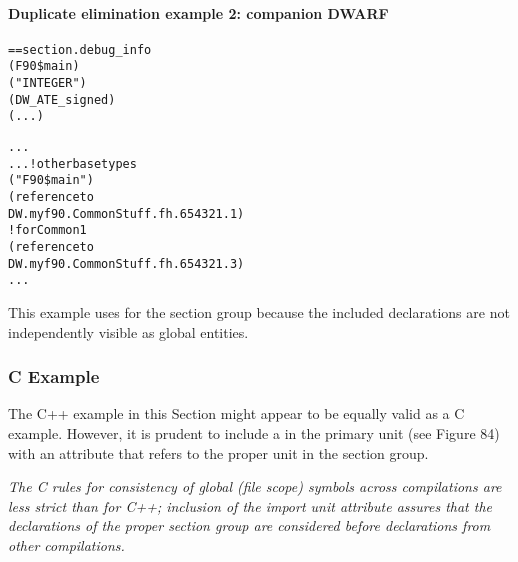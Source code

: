 \paragraph{Duplicate elimination example 2: companion DWARF }
\label{app:duplicateeliminationexample2companiondwarf}

\begin{alltt}
== section .debug\_info
        (F90\$main)
            ("INTEGER")
            (DW\-\_ATE\-\_signed)
            (...)

            ...
        ...  ! other base types
            ("F90\$main")
                (reference to
                    DW.myf90.CommonStuff.fh.654321.1)
             ! for Common1
                (reference to
                    DW.myf90.CommonStuff.fh.654321.3)
            ...
\end{alltt}


This example uses  for the section group
because the included declarations are not independently
visible as global entities.


\subsubsection{C Example}

The C++ example in this Section might appear to be equally
valid as a C example. However, it is prudent to include
a  in the primary unit (see Figure 84)
with an  attribute that refers to the proper unit
in the section group.

\textit{The C rules for consistency of global (file scope) symbols
across compilations are less strict than for C++; inclusion
of the import unit attribute assures that the declarations of
the proper section group are considered before declarations
from other compilations.}


